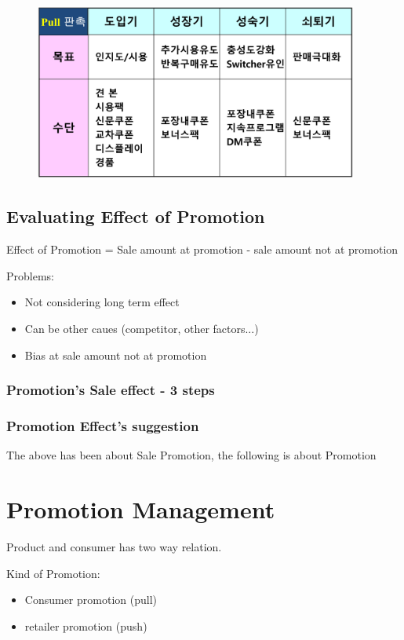 \documentclass[12pt]{article}
\begin{document}
\begin{itemize}
\begin{figure}[H]
	\centering
	\includegraphics[width=0.95\textwidth]{img/POM_3-d3e0b158.png}
	\caption{}
	\label{}
\end{figure}

\subsection{Evaluating Effect of Promotion}

Effect of Promotion = Sale amount at promotion - sale amount not at promotion

Problems:
\begin{itemize}
	\item Not considering long term effect
	\item Can be other caues (competitor, other factors...)
	\item Bias at sale amount not at promotion
\end{itemize}

\subsubsection{Promotion's Sale effect - 3 steps}

\subsubsection{Promotion Effect's suggestion}


The above has been about Sale Promotion, the following is about Promotion
\section{Promotion Management}

Product and consumer has two way relation.

Kind of Promotion:\begin{itemize}
	\item Consumer promotion (pull)
	\item retailer promotion (push)
\end{itemize}


\end{itemize}
\end{document}
